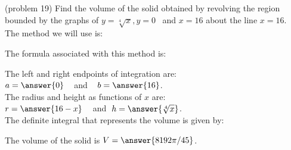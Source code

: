 \documentclass{ximera}
\begin{document}
\begin{problem}(problem 19)
Find the volume of the solid obtained by revolving the region bounded by the graphs of $y = \sqrt[4] x, y = 0$ \, and $x = 16$ about the line $x = 16$.\\
The method we will use is:
\begin{multipleChoice}
\end{multipleChoice}

The formula associated with this method is:
\begin{multipleChoice}
\end{multipleChoice}

The left and right endpoints of integration are:\\
$a = \answer{0}\;\;\;$ and $\;\;\; b = \answer{16}$.\\
The radius and height as functions of $x$ are:\\
$r = \answer{16-x} \;\;\;$ and $\; h = \answer{\sqrt[4]{x} }$.\\

The definite integral that represents the volume is given by:\\
\begin{multipleChoice}
\end{multipleChoice}

The volume of the solid is $V = \answer{8192\pi/45}$.

\end{problem}
\end{document}
